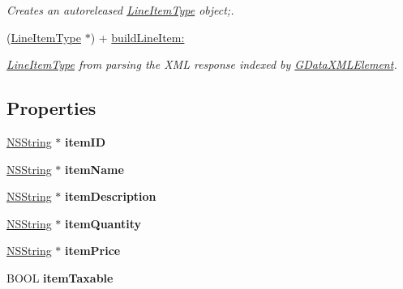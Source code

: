 \begin{DoxyCompactItemize}
\begin{DoxyCompactList}\small\item\em Creates an autoreleased \hyperlink{interface_line_item_type}{LineItemType} object;. \item\end{DoxyCompactList}\item 
(\hyperlink{interface_line_item_type}{LineItemType} $\ast$) + \hyperlink{interface_line_item_type_a1c4b1049a9982dd49c15debfad0df9b5}{buildLineItem:}
\begin{DoxyCompactList}\small\item\em \hyperlink{interface_line_item_type}{LineItemType} from parsing the XML response indexed by \hyperlink{interface_g_data_x_m_l_element}{GDataXMLElement}. \item\end{DoxyCompactList}\end{DoxyCompactItemize}
\subsection*{Properties}
\begin{DoxyCompactItemize}
\item 
\hypertarget{interface_line_item_type_a53bff8d538ab270f5fdd114eb4be9078}{
\hyperlink{class_n_s_string}{NSString} $\ast$ {\bfseries itemID}}
\label{interface_line_item_type_a53bff8d538ab270f5fdd114eb4be9078}

\item 
\hypertarget{interface_line_item_type_ada7279ead130d4fc5a375744d90dc187}{
\hyperlink{class_n_s_string}{NSString} $\ast$ {\bfseries itemName}}
\label{interface_line_item_type_ada7279ead130d4fc5a375744d90dc187}

\item 
\hypertarget{interface_line_item_type_af94f2c77bdd2f1bf1335143675c215e5}{
\hyperlink{class_n_s_string}{NSString} $\ast$ {\bfseries itemDescription}}
\label{interface_line_item_type_af94f2c77bdd2f1bf1335143675c215e5}

\item 
\hypertarget{interface_line_item_type_a477c72e31764d61b90b3f4e38e641d34}{
\hyperlink{class_n_s_string}{NSString} $\ast$ {\bfseries itemQuantity}}
\label{interface_line_item_type_a477c72e31764d61b90b3f4e38e641d34}

\item 
\hypertarget{interface_line_item_type_aaac0988f1e8fa71523277dea5459c000}{
\hyperlink{class_n_s_string}{NSString} $\ast$ {\bfseries itemPrice}}
\label{interface_line_item_type_aaac0988f1e8fa71523277dea5459c000}

\item 
\hypertarget{interface_line_item_type_a2030a9d288cbd314631fb2d816a04ec7}{
BOOL {\bfseries itemTaxable}}
\label{interface_line_item_type_a2030a9d288cbd314631fb2d816a04ec7}

\end{DoxyCompactItemize}


